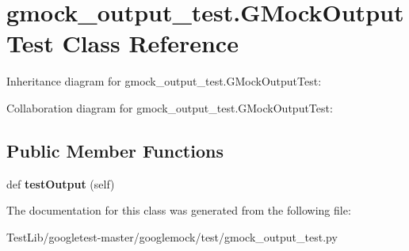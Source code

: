 \hypertarget{classgmock__output__test_1_1GMockOutputTest}{}\section{gmock\+\_\+output\+\_\+test.\+G\+Mock\+Output\+Test Class Reference}
\label{classgmock__output__test_1_1GMockOutputTest}


Inheritance diagram for gmock\+\_\+output\+\_\+test.\+G\+Mock\+Output\+Test\+:


Collaboration diagram for gmock\+\_\+output\+\_\+test.\+G\+Mock\+Output\+Test\+:
\subsection*{Public Member Functions}
\begin{DoxyCompactItemize}
\item 
\mbox{\label{classgmock__output__test_1_1GMockOutputTest_a661e7846690f48328fd9e0834fde9980}} 
def {\bfseries test\+Output} (self)
\end{DoxyCompactItemize}


The documentation for this class was generated from the following file\+:\begin{DoxyCompactItemize}
\item 
Test\+Lib/googletest-\/master/googlemock/test/gmock\+\_\+output\+\_\+test.\+py\end{DoxyCompactItemize}
